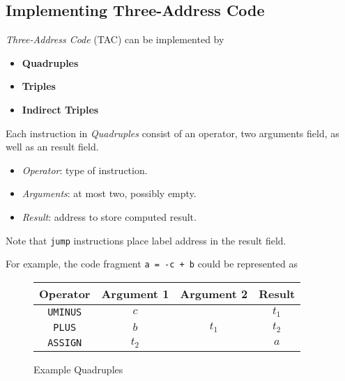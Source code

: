 \subsection{Implementing Three-Address Code}

\begin{definition}
    \textit{Three-Address Code} (TAC) can be implemented by
    \begin{itemize}
        \item \textbf{Quadruples}
        \item \textbf{Triples}
        \item \textbf{Indirect Triples}
    \end{itemize}
\end{definition}

\begin{definition}[Quadruples]
    Each instruction in \textit{Quadruples} consist of an operator, two arguments field, as well as an result field.
    \begin{itemize}
        \item \textit{Operator}: type of instruction.
        \item \textit{Arguments}: at most two, possibly empty.
        \item \textit{Result}: address to store computed result.
    \end{itemize}
    
    Note that \texttt{jump} instructions place label address in the result field.
    
    For example, the code fragment \texttt{a = -c + b} could be represented as
    \begin{figure}[H]
        \centering
        \begin{tabular}{@{} c c c c @{}}
            \toprule
            Operator & Argument 1 & Argument 2 & Result \\
            \midrule
            \texttt{UMINUS} & $c$   &       & $t_1$ \\
            \texttt{PLUS}   & $b$   & $t_1$ & $t_2$ \\
            \texttt{ASSIGN} & $t_2$ &       & $a$ \\
            \bottomrule
        \end{tabular}
        \caption{Example Quadruples}
        \label{fig:example-quadruples}
    \end{figure}
\end{definition}

